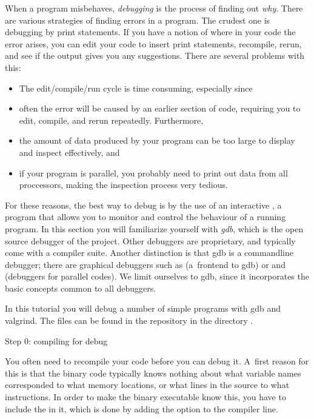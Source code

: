 
When a program misbehaves, \emph{debugging} is the process of finding
out \emph{why}.
There are various strategies of finding errors in a program.
The crudest one is debugging by print statements. If you have a
notion of where in your code the error arises, you can edit your code
to insert print statements, recompile, rerun, and see if the output
gives you any suggestions. There are several problems with this:
\begin{itemize}
\item The edit/compile/run cycle is time consuming, especially since
\item often the error will be caused by an earlier section of code,
  requiring you to edit, compile, and rerun repeatedly. Furthermore,
\item the amount of data produced by your program can be too large to
  display and inspect effectively, and
\item if your program is parallel, you probably need to print out data
  from all proccessors, making the inspection process very tedious.
\end{itemize}


For these reasons, the best way to debug is by the use of an
interactive , a program that allows you to monitor
and control the behaviour of a running program. In this section you
will familiarize yourself with
\emph{gdb}, which is the open source
debugger of the  project. Other debuggers are
proprietary, and typically come with a compiler suite. Another
distinction is that gdb is a commandline debugger; there are
graphical debuggers such as  (a~frontend to gdb) or
 and  (debuggers for parallel
codes). We limit ourselves to gdb, since it incorporates the basic
concepts common to all debuggers.

In this tutorial you will debug a number of simple programs with
gdb and valgrind. The files can be found in the repository
in the directory .

 {Step 0: compiling for debug}

You often need to recompile your code before you can debug it.
A~first reason for this is that the binary code typically knows
nothing about what variable names corresponded to what memory locations,
or what lines in the source to what instructions. In order to make
the binary executable know this, you have to include the 
in it, which is done by adding the  option to the compiler line.

